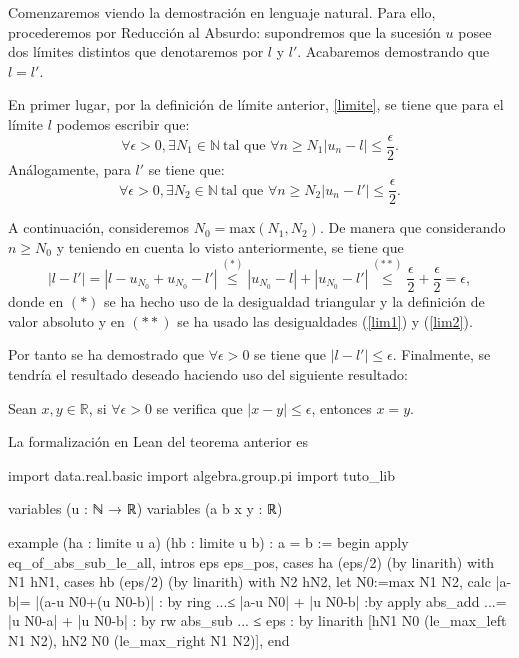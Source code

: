 \begin{demostracion}
  Comenzaremos viendo la demostración en lenguaje natural. Para ello, procederemos por Reducción al Absurdo: supondremos que la sucesión \( u\) posee dos límites distintos que denotaremos por \( l\) y \(l'\). Acabaremos demostrando que \(l=l'\). 
  
  En primer lugar, por la definición de límite anterior, \ref{limite}, se tiene que para el límite \(l \) podemos escribir que:
  \begin{equation}\label{lim1}
  \forall \epsilon >0, \exists N_1 \in \mathbb{N} \ \text{tal que }\forall n \geq N_1 |u_n-l| \leq \frac{\epsilon}{2}.
  \end{equation}
  Análogamente, para \(l'\) se tiene que:
  \begin{equation}\label{lim2}
  \forall \epsilon >0, \exists N_2 \in \mathbb{N} \ \text{tal que }\forall n \geq N_2 |u_n-l'| \leq \frac{\epsilon}{2}.
  \end{equation}
  
  A continuación, consideremos \( N_0 = \text{max} (N_1,N_2)\). De manera que considerando \(n \geq N_0\) y teniendo en cuenta lo visto anteriormente, se tiene que
  \begin{equation*}
  |l-l'|=|l-u_{N_0}+u_{N_0}-l'| \stackrel{(*)}{\leq} |u_{N_0}-l|+|u_{N_0}-l'| \stackrel{(**)}{\leq} \frac{\epsilon}{2}+\frac{\epsilon}{2}=\epsilon,
  \end{equation*}
  donde en \((*)\) se ha hecho uso de la desigualdad triangular y la definición de valor absoluto y en \((**)\) se ha usado las desigualdades (\ref{lim1}) y (\ref{lim2}).
  
  Por tanto se ha demostrado que \(\forall \epsilon >0\) se tiene que \( |l-l'| \leq \epsilon \). Finalmente, se tendría el resultado deseado haciendo uso del siguiente resultado:

  	Sean \(x,y \in \mathbb{R}\), si \(\forall \epsilon >0\) se verifica que \( |x-y| \leq \epsilon \), entonces \(x=y\).
\end{demostracion}

La formalización en Lean del teorema anterior es
\begin{leancode}
import data.real.basic
import algebra.group.pi
import tuto_lib

variables (u : ℕ → ℝ)
variables (a b x y : ℝ)

example
(ha : limite u a)
(hb : limite u b)
: a = b :=
begin
apply eq_of_abs_sub_le_all,
intros eps eps_pos,
cases ha (eps/2) (by linarith) with N1 hN1,
cases hb (eps/2) (by linarith) with N2 hN2,
let N0:=max N1 N2,
calc |a-b|= |(a-u N0+(u N0-b)| : by ring
...≤ |a-u N0| + |u N0-b| :by apply abs_add
...= |u N0-a| + |u N0-b| : by rw abs_sub 
... ≤ eps : by linarith [hN1 N0 (le_max_left N1 N2), 
hN2 N0 (le_max_right N1 N2)],
end
\end{leancode}

